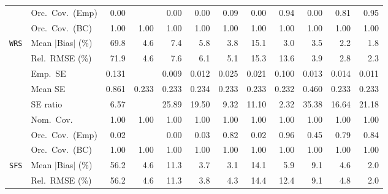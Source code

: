 \begin{landscape}
\begin{longtable}{llrrrrrrrrrr}
 & Orc.\ Cov.\ (Emp) & 0.00 &  & 0.00 & 0.00 & 0.09 & 0.00 & \cellcolor{ranktwo}0.94 & 0.00 & \cellcolor{rankthree}0.81 & \cellcolor{rankone}0.95 \\
 & Orc.\ Cov.\ (BC) & \cellcolor{rankone}1.00 & \cellcolor{rankone}1.00 & \cellcolor{rankone}1.00 & \cellcolor{rankone}1.00 & \cellcolor{rankone}1.00 & \cellcolor{rankone}1.00 & \cellcolor{rankone}1.00 & \cellcolor{rankone}1.00 & \cellcolor{rankone}1.00 & \cellcolor{rankone}1.00 \\
\addlinespace[2pt]
\quad \texttt{WRS} & Mean $|$Bias$|$ (\%) & 69.8 & 4.6 & 7.4 & 5.8 & 3.8 & 15.1 & \cellcolor{rankthree}3.0 & 3.5 & \cellcolor{ranktwo}2.2 & \cellcolor{rankone}1.8 \\
 & Rel.\ RMSE (\%) & 71.9 & 4.6 & 7.6 & 6.1 & 5.1 & 15.3 & 13.6 & \cellcolor{rankthree}3.9 & \cellcolor{ranktwo}2.8 & \cellcolor{rankone}2.3 \\
 & Emp.\ SE & 0.131 &  & 0.009 & 0.012 & 0.025 & 0.021 & 0.100 & 0.013 & 0.014 & 0.011 \\
 & Mean SE & 0.861 & 0.233 & 0.233 & 0.234 & 0.233 & 0.233 & 0.232 & 0.460 & 0.233 & 0.233 \\
 & SE ratio & \cellcolor{ranktwo}6.57 &  & 25.89 & 19.50 & \cellcolor{rankthree}9.32 & 11.10 & \cellcolor{rankone}2.32 & 35.38 & 16.64 & 21.18 \\
 & Nom.\ Cov. & \cellcolor{rankone}1.00 & \cellcolor{rankone}1.00 & \cellcolor{rankone}1.00 & \cellcolor{rankone}1.00 & \cellcolor{rankone}1.00 & \cellcolor{rankone}1.00 & \cellcolor{rankone}1.00 & \cellcolor{rankone}1.00 & \cellcolor{rankone}1.00 & \cellcolor{rankone}1.00 \\
 & Orc.\ Cov.\ (Emp) & 0.02 &  & 0.00 & 0.03 & \cellcolor{rankthree}0.82 & 0.02 & \cellcolor{rankone}0.96 & 0.45 & 0.79 & \cellcolor{ranktwo}0.84 \\
 & Orc.\ Cov.\ (BC) & \cellcolor{rankone}1.00 & \cellcolor{rankone}1.00 & \cellcolor{rankone}1.00 & \cellcolor{rankone}1.00 & \cellcolor{rankone}1.00 & \cellcolor{rankone}1.00 & \cellcolor{rankone}1.00 & \cellcolor{rankone}1.00 & \cellcolor{rankone}1.00 & \cellcolor{rankone}1.00 \\
\addlinespace[2pt]
\quad \texttt{SFS} & Mean $|$Bias$|$ (\%) & 56.2 & 4.6 & 11.3 & \cellcolor{rankthree}3.7 & \cellcolor{ranktwo}3.1 & 14.1 & 5.9 & 9.1 & 4.6 & \cellcolor{rankone}2.0 \\
 & Rel.\ RMSE (\%) & 56.2 & 4.6 & 11.3 & \cellcolor{ranktwo}3.8 & \cellcolor{rankthree}4.3 & 14.4 & 12.4 & 9.1 & 4.8 & \cellcolor{rankone}2.0 \\

\end{longtable}
\end{landscape}
